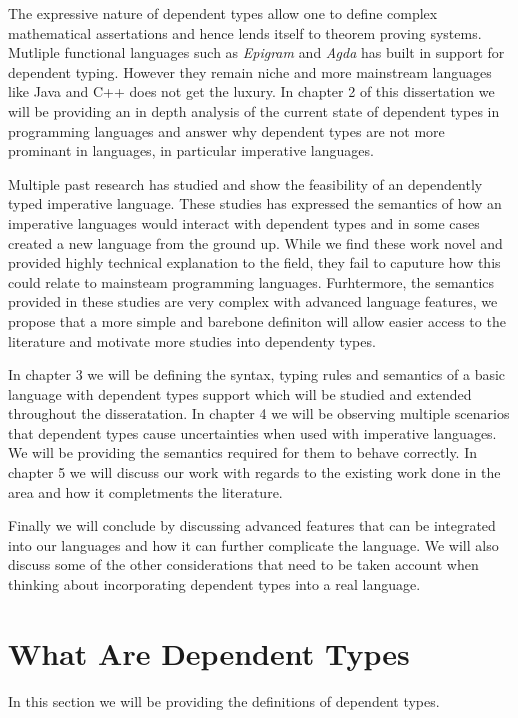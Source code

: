 \documentclass[a4paper,12pt]{report}
\begin{document}
\par
The expressive nature of dependent types allow one to define complex 
mathematical assertations and hence lends itself to theorem proving systems. 
Mutliple functional languages such as \textit{Epigram} 
\cite{epigram} and \textit{Agda} \cite{agda} has 
built in support for dependent typing. However they remain niche and more 
mainstream languages like Java and C++ does not get the luxury. In chapter 2 of 
this dissertation we will be providing an in depth analysis of the current state 
of dependent types in programming languages and answer why dependent types are 
not more prominant in languages, in particular imperative languages.

\par
Multiple past research has studied and show the feasibility of an dependently typed 
imperative language. These studies has expressed the semantics of 
how an imperative languages would interact with dependent types and in some 
cases created a new language from the ground up. While we find these work novel 
and provided highly technical explanation to the field, they fail to caputure 
how this could relate to mainsteam programming languages. Furhtermore, the 
semantics provided in these studies are very complex with advanced language 
features, we propose that a more simple and barebone definiton will allow easier 
access to the literature and motivate more studies into dependenty types. 

\par
In chapter 3 we will be defining the syntax, typing rules and semantics 
of a basic language with dependent types support which will be studied 
and extended throughout the disseratation. In chapter 4 we will be observing 
multiple scenarios that dependent types cause uncertainties when used with 
imperative languages. We will be providing the semantics required for them 
to behave correctly. In chapter 5 we will discuss our work with regards to the 
existing work done in the area and how it completments the literature. 

\par
Finally we will conclude by discussing advanced features that can be integrated 
into our languages and how it can further complicate the language. We will also 
discuss some of the other considerations that need to be taken account when 
thinking about incorporating dependent types into a real language. 

\section{What Are Dependent Types}
In this section we will be providing the definitions of dependent types.
\end{document}
